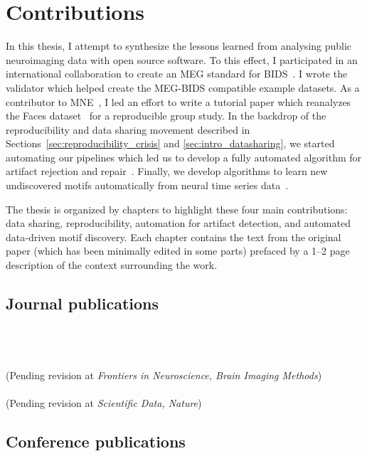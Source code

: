 \section{Contributions}
In this thesis, I attempt to synthesize the lessons learned from analysing public neuroimaging data with open source software. To this effect, I participated in an international collaboration to create an \ac{MEG} standard for  \ac{BIDS}~\citep{galan2017meg}. I wrote the validator which helped create the MEG-BIDS compatible example datasets. As a contributor to MNE~\citep{gramfort2013meg}, I led an effort to write a tutorial paper which reanalyzes the Faces dataset~\citep{wakeman2015multi} for a reproducible group study. In the backdrop of the reproducibility and data sharing movement described in Sections~\ref{sec:reproducibility_crisis} and \ref{sec:intro_datasharing}, we started automating our pipelines which led us to develop a fully automated algorithm for artifact rejection and repair~\citep{jas2016automated, jas2017autoreject}. Finally, we develop algorithms to learn new undiscovered motifs automatically from neural time series data~\citep{jas2017learning}. 

The thesis is organized by chapters to highlight these four main  contributions: data sharing, reproducibility, automation for artifact detection, and automated data-driven motif discovery. Each chapter contains the text from the original paper (which has been minimally edited in some parts) prefaced by a 1--2 page description of the context surrounding the work.

\subsection*{Journal publications}
\ \\ \\
\ \\ (Pending revision at \emph{Frontiers in Neuroscience, Brain Imaging Methods})\ \\ \\
 (Pending revision at \emph{Scientific Data, Nature})

\subsection*{Conference publications}
\ \\ \\

